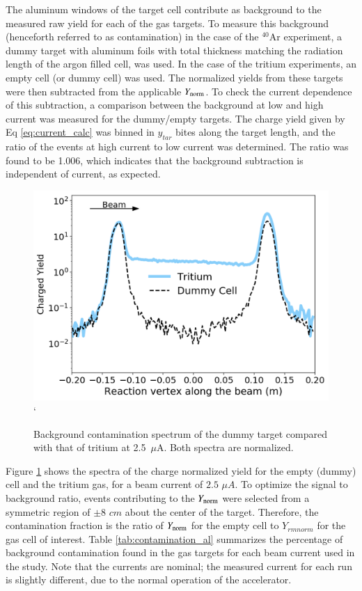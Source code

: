 \documentclass[final,5p,times,twocolumn]{elsarticle}
\begin{document}
The aluminum windows of the target cell contribute as background to the measured raw yield for each of the gas targets. 
To measure this background (henceforth referred to as contamination) in the case of the $^{40}$Ar experiment, 
a dummy target with aluminum foils with total thickness matching the radiation length of the argon filled cell, 
was used.
In the case of the tritium experiments, an empty cell (or dummy cell)  was used. The normalized yields from 
these targets were then subtracted from the applicable $Y_{\rm{norm}}$. To check the current dependence of 
this subtraction, a comparison between the background at low and high current was measured for the dummy/empty targets. The charge yield given by Eq \ref{eq:current_calc} was binned in $y_{tar}$ bites along the target length, and the ratio of the events at high current to low current was determined. The ratio was found to be 1.006, which indicates that the background subtraction is independent of current, as expected. 

\begin{figure}[h]
 \centering
 \includegraphics[width=\linewidth]{images/contamination.pdf}`
  \caption{Background contamination spectrum of the dummy target compared with that of tritium at 2.5~$\mu$A.  Both spectra are normalized.}
  \label{fig:bk_empty}
\end{figure}

Figure \ref{fig:bk_empty} shows the spectra of the charge normalized yield for the empty (dummy) cell and the tritium gas, for a beam current of $2.5$ $\mu A$. To optimize the signal to background ratio, events contributing to the $Y_{\rm{norm}}$ were selected from a symmetric region of $\pm 8$ $cm$ about the center of the target. Therefore, the contamination fraction is the ratio of $Y_{\rm{norm}}$ for the empty cell to $Y_{rm{norm}}$ for the gas cell of interest. Table \ref{tab:contamination_al} summarizes the percentage of background contamination found in the gas targets for each beam current used in the study. Note that the currents are nominal; the measured current for each run is slightly different, due to the normal operation of the accelerator.
 
\end{document}
